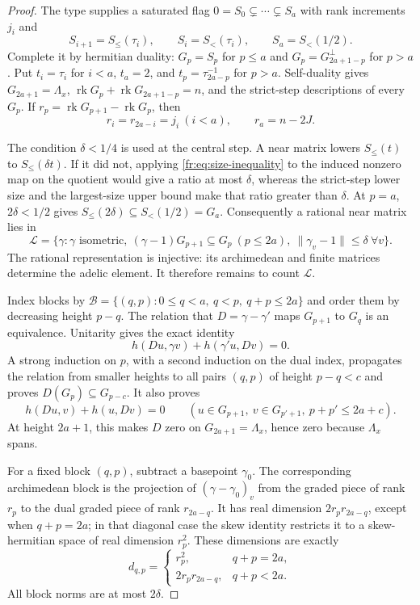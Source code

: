 \begin{proof}
The type supplies a saturated flag $0=S_0\subsetneq\cdots\subsetneq S_a$ with rank increments $j_i$ and
\[
 S_{i+1}=S_{\le}(\tau_i),\qquad S_i=S_{<}(\tau_i),\qquad S_a=S_{<}(1/2).
\]
Complete it by hermitian duality: $G_p=S_p$ for $p\le a$ and $G_p=G_{2a+1-p}^{\perp}$ for $p>a$. Put $t_i=\tau_i$ for $i<a$, $t_a=2$, and $t_p=\tau_{2a-p}^{-1}$ for $p>a$. Self-duality gives $G_{2a+1}=\Lambda_x$, $\operatorname{rk}G_p+\operatorname{rk}G_{2a+1-p}=n$, and the strict-step descriptions of every $G_p$. If $r_p=\operatorname{rk}G_{p+1}-\operatorname{rk}G_p$, then
\[
 r_i=r_{2a-i}=j_i\ (i<a),\qquad r_a=n-2J.
\]

The condition $\delta<1/4$ is used at the central step. A near matrix lowers $S_{\le}(t)$ to $S_{\le}(\delta t)$. If it did not, applying \eqref{fr:eq:size-inequality} to the induced nonzero map on the quotient would give a ratio at most $\delta$, whereas the strict-step lower size and the largest-size upper bound make that ratio greater than $\delta$. At $p=a$, $2\delta<1/2$ gives $S_{\le}(2\delta)\subseteq S_{<}(1/2)=G_a$. Consequently a rational near matrix lies in
\[
 \mathcal L=\{\gamma:\gamma\text{ isometric},\ ( \gamma-1)G_{p+1}\subseteq G_p\ (p\le2a),\
 \|\gamma_v-1\|\le\delta\ \forall v\}.
\]
The rational representation is injective: its archimedean and finite matrices determine the adelic element. It therefore remains to count $\mathcal L$.

Index blocks by $\mathcal B=\{(q,p):0\le q<a,\ q<p,\ q+p\le2a\}$ and order them by decreasing height $p-q$. The relation that $D=\gamma-\gamma'$ maps $G_{p+1}$ to $G_q$ is an equivalence. Unitarity gives the exact identity
\[
 h(Du,\gamma v)+h(\gamma'u,Dv)=0.
\]
A strong induction on $p$, with a second induction on the dual index, propagates the relation from smaller heights to all pairs $(q,p)$ of height $p-q<c$ and proves $D(G_p)\subseteq G_{p-c}$. It also proves
\[
 h(Du,v)+h(u,Dv)=0\qquad
 (u\in G_{p+1},\ v\in G_{p'+1},\ p+p'\le2a+c).
\]
At height $2a+1$, this makes $D$ zero on $G_{2a+1}=\Lambda_x$, hence zero because $\Lambda_x$ spans.

For a fixed block $(q,p)$, subtract a basepoint $\gamma_0$. The corresponding archimedean block is the projection of $(\gamma-\gamma_0)_v$ from the graded piece of rank $r_p$ to the dual graded piece of rank $r_{2a-q}$. It has real dimension $2r_pr_{2a-q}$, except when $q+p=2a$; in that diagonal case the skew identity restricts it to a skew-hermitian space of real dimension $r_p^2$. These dimensions are exactly
\[
 d_{q,p}=\begin{cases}r_p^2,&q+p=2a,\\2r_pr_{2a-q},&q+p<2a.\end{cases}
\]
All block norms are at most $2\delta$.


\end{proof}
